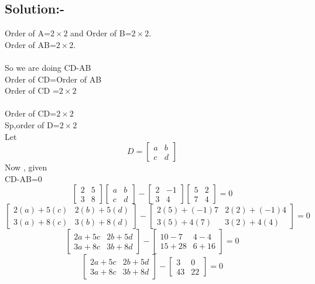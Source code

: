 \documentclass[a4paper,12pt]{article}
\begin{document}
\subsection{Solution:-}
Order of A=$2\times2$ and Order of B=$2\times2$.\\
Order of AB=$2\times2$.\\\\
So we are doing CD-AB\\
Order of CD=Order of AB\\
Order of CD =$2\times2$\\\\
Order of CD=$2\times2$\\
Sp,order of D=$2\times2$\\
Let\[D=\begin{bmatrix}
	a & b\\
	c & d
\end{bmatrix}\]
Now , given\\
CD-AB=0\\
\[\begin{bmatrix}
	2 & 5\\
	3 & 8
\end{bmatrix} \begin{bmatrix}
a & b\\
c & d
\end{bmatrix}-\begin{bmatrix}
2 & -1\\
3 & 4
\end{bmatrix} \begin{bmatrix}
5 & 2\\
7 & 4
\end{bmatrix}=0\]
\[\begin{bmatrix}
	2(a)+5(c) & 2(b)+5(d)\\
	3(a)+8(c) & 3(b)+8(d)
\end{bmatrix}-\begin{bmatrix}
2(5)+(-1)7 & 2(2)+(-1)4\\
3(5)+4(7) & 3(2)+4(4)
\end{bmatrix}=0\]
\[\begin{bmatrix}
	2a+5c & 2b+5d\\
	3a+8c & 3b+8d
\end{bmatrix}-\begin{bmatrix}
	10-7 & 4-4\\
	15+28 & 6+16
\end{bmatrix}=0\]
\[\begin{bmatrix}
	2a+5c & 2b+5d\\
	3a+8c & 3b+8d
\end{bmatrix}-\begin{bmatrix}
	3 & 0\\
	43 & 22
\end{bmatrix}=0\]
\end{document}
